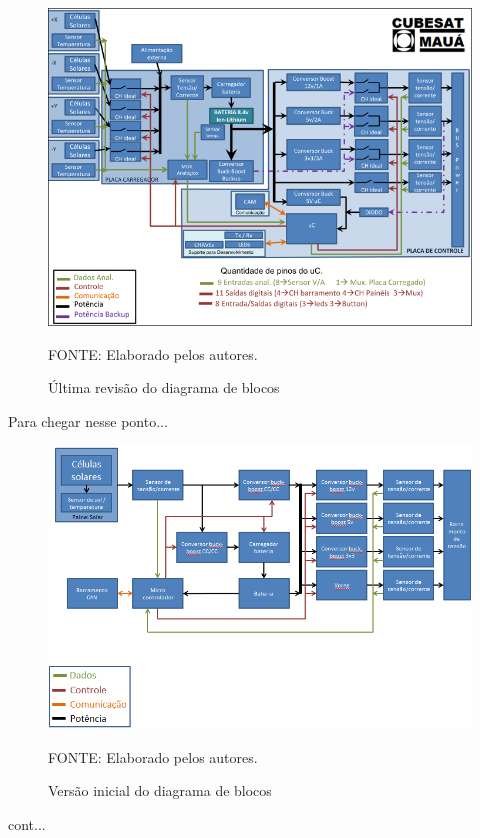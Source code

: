 \documentclass[
	12pt,				%
	openright,			%
	oneside,			%
	a4paper,			%
	english,			%
	french,				%
	spanish,			%
	brazil,				%
	oldfontcommands
	]{abntex2}
\begin{document}
	\begin{figure}[th]
		\caption{Última revisão do diagrama de blocos}
		\label{Fig_Diag_Blocos_Final}
		\centering
		\includegraphics[width=1.0\linewidth]{./figs/diag_blocos}
			
		\begin{small}
			FONTE: Elaborado pelos autores.
		\end{small}		
	\end{figure}
	\pagebreak
	
	Para chegar nesse ponto...
	
	\begin{figure}[th]
		\caption{Versão inicial do diagrama de blocos}
		\label{Fig_Diag_Blocos_Inicial}
		\centering
		\includegraphics[width=0.75\linewidth]{./figs/diag_blocos_inicial}
			
		\begin{small}
			FONTE: Elaborado pelos autores.
		\end{small}		
	\end{figure}	
	\pagebreak
	cont...
\end{document}
